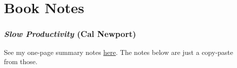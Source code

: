\part{Book Notes}
	\label{BN}
	
\section{\textit{Slow Productivity} (Cal Newport)}

	See my one-page summary notes \href{https://drive.google.com/file/d/1QVwVWPOWDxaMUlvx2ybjXujJ8yDLyyFz/view?usp=sharing}{here}. The notes below are just a copy-paste from those.
	
